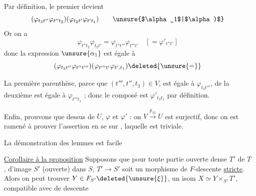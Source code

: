 Par définition, le premier  devient
\[
(\varphi_{t_3t''}\varphi_{t''t_2})(\varphi_{t_2t'}\varphi_{t't_1})\tag*{\unsure{$\alpha_1$|$\alpha)$}}
\]
Or on a
\[
\varphi_{t''t_2}\varphi_{t_2t'}=\varphi_{t''t'''}\varphi_{t'''t'}\quad [=\varphi'_{t''t'}]
\]
donc la  expression $\unsure{\alpha_1}$ est égale à
\[
(\varphi_{t_3t''}\varphi_{t''t'''})
(\varphi_{t'''t'}\varphi_{t',t_1})\deleted{\unsure{=}}
\]

La première parenthèse, parce que $(t''',t'',t_3)\in V$, est égale à $\varphi_{t_3t'''}$, de  la deuxième est égale à $\varphi_{t'''t_1}$ ; donc le composé est $\varphi'_{t_3t_1}$ par définition.

Enfin, prouvons que  dessus de $U$, $\varphi$ et $\varphi'$  : on   $V\xrightarrow{p_{13}}U$ est surjectif,  donc on est ramené à prouver l'assertion  en se  sur , laquelle est triviale.


La démonstration des lemmes est facile

\uline{Corollaire à la proposition} Supposons que pour toute partie ouverte dense $T'$ de $T$, d'image $S'$ (ouverte) dans $S$, $T'\to S'$ soit un morphisme de $F$-descente \uline{stricte}. Alors on peut trouver  $Y\in F_{S'}\deleted{\unsure{\xi}}$,  un isom $X\simeq Y\times_{S'}T'$, compatible avec  de descente
